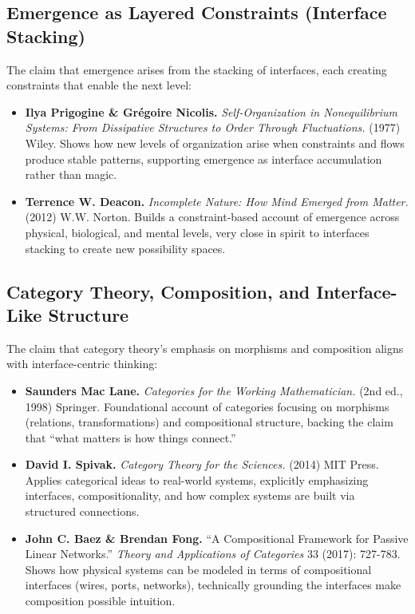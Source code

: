 \documentclass[
  openright]{book}
\begin{document}
\subsection{Emergence as Layered Constraints (Interface
Stacking)}\label{emergence-as-layered-constraints-interface-stacking}

The claim that emergence arises from the stacking of interfaces, each
creating constraints that enable the next level:

\begin{itemize}
\item
  \textbf{Ilya Prigogine \& Grégoire Nicolis.} \emph{Self-Organization
  in Nonequilibrium Systems: From Dissipative Structures to Order
  Through Fluctuations.} (1977) Wiley. Shows how new levels of
  organization arise when constraints and flows produce stable patterns,
  supporting emergence as interface accumulation rather than magic.
\item
  \textbf{Terrence W. Deacon.} \emph{Incomplete Nature: How Mind Emerged
  from Matter.} (2012) W.W. Norton. Builds a constraint-based account of
  emergence across physical, biological, and mental levels, very close
  in spirit to interfaces stacking to create new possibility spaces.
\end{itemize}

\subsection{Category Theory, Composition, and Interface-Like
Structure}\label{category-theory-composition-and-interface-like-structure}

The claim that category theory's emphasis on morphisms and composition
aligns with interface-centric thinking:

\begin{itemize}
\item
  \textbf{Saunders Mac Lane.} \emph{Categories for the Working
  Mathematician.} (2nd ed., 1998) Springer. Foundational account of
  categories focusing on morphisms (relations, transformations) and
  compositional structure, backing the claim that ``what matters is how
  things connect.''
\item
  \textbf{David I. Spivak.} \emph{Category Theory for the Sciences.}
  (2014) MIT Press. Applies categorical ideas to real-world systems,
  explicitly emphasizing interfaces, compositionality, and how complex
  systems are built via structured connections.
\item
  \textbf{John C. Baez \& Brendan Fong.} ``A Compositional Framework for
  Passive Linear Networks.'' \emph{Theory and Applications of
  Categories} 33 (2017): 727-783. Shows how physical systems can be
  modeled in terms of compositional interfaces (wires, ports, networks),
  technically grounding the interfaces make composition possible
  intuition.
\end{itemize}
\end{document}
